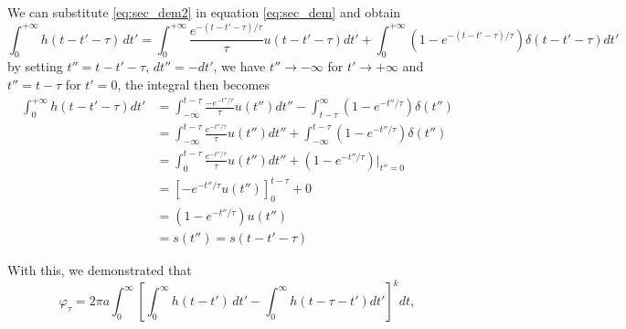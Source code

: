 We can substitute \ref{eq:sec_dem2} in equation \ref{eq:sec_dem} and obtain \begin{equation}
    \int_{0}^{+\infty} h(t - t' - \tau) \, dt' = \int_{0}^{+\infty} \frac{e^{-(t - t' - \tau)/\tau}}{\tau} u(t - t' - \tau) dt' + \int_{0}^{+\infty} \left(1 - e^{-(t - t' - \tau)/\tau} \right) \delta(t - t' - \tau) dt'
\end{equation}
by setting $t'' = t-t'-\tau$, $dt''=-dt'$,  we have $t''\rightarrow -\infty$ for $t'\rightarrow +\infty$ and $t'' = t-\tau$ for $t'= 0$, the integral then becomes
\begin{align}
    \int_{0}^{+\infty} h(t - t'-\tau) dt' &= \int_{-\infty}^{t - \tau} \frac{-e^{-t''/\tau}}{\tau} u(t'') dt'' - \int_{t - \tau}^{\infty} (1 - e^{-t''/\tau}) \delta(t'')\\
    &= \int_{-\infty}^{t - \tau} \frac{e^{-t''/\tau}}{\tau} u(t'') dt'' + \int_{-\infty}^{t - \tau} (1 - e^{-t''/\tau}) \delta(t'')\\
    &= \int_{0}^{t - \tau} \frac{e^{-t''/\tau}}{\tau} u(t'') dt'' + \left(1 - e^{-t''/\tau} \right) \Big|_{t''=0}\\
    &= \left[ - e^{-t''/\tau} u(t'') \right]_{0}^{t - \tau} + 0\\
    &= (1 - e^{-t''/\tau}) u(t'')\\
    &= s(t'') = s(t - t' - \tau)
\end{align}

With this, we demonstrated that 
\begin{equation}
    \varphi_\tau = 2\pi a \int_{0}^{\infty} \left[ \int_{0}^{\infty} h(t - t') \, dt' - \int_{0}^{\infty} h(t - \tau - t') dt' \right]^k dt ,
\end{equation}

